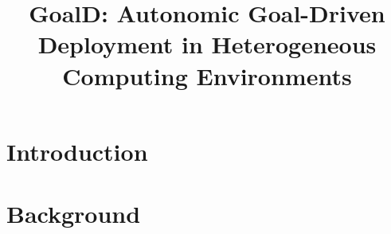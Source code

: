\documentclass[bacharelado]{packages/unb-cic}%
\title{GoalD: Autonomic Goal-Driven Deployment in Heterogeneous Computing Environments}
\begin{document}
\maketitle

\pretextual



\begin{abstract}%

% 

\end{abstract}

\tableofcontents
\listoffigures

\textual

\chapter{Introduction}
\label{chap:introduction}


\chapter{Background}
\label{chap:background}


% 

% 

% 
%

\postextual
\anexos




\end{document}
